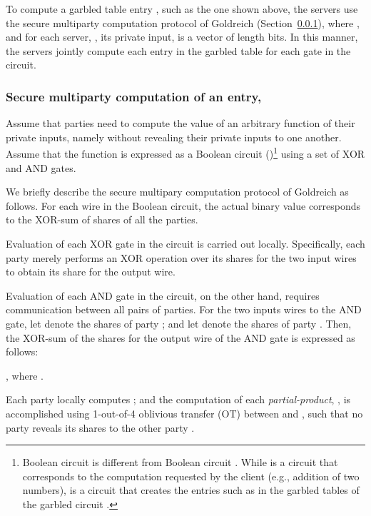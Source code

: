 \documentclass[10pt,journal,cspaper,compsoc]{IEEEtran}
\begin{document}
To compute a garbled table entry , such as the one shown above, the  servers use the secure multiparty computation protocol of Goldreich \cite{goldreich04,goldreich87} (Section~\ref{sec_secure_multiparty_construction_Goldreich}), where , and for each server, , its private input,  is a vector of length  bits. In this manner, the  servers jointly compute each entry in the garbled table for each gate in the circuit.



\subsubsection{Secure multiparty computation of an entry, }
\label{sec_secure_multiparty_construction_Goldreich}

Assume that  parties need to compute the value of an arbitrary function of their private inputs, namely  without revealing their private inputs to one another. Assume that the function  is expressed as a Boolean circuit ()\footnote{Boolean circuit  is different from Boolean circuit . While  is a circuit that corresponds to the computation requested by the client (e.g., addition of two numbers),  is a circuit that creates the entries such as  in the garbled tables of the garbled circuit .} using a set of XOR and AND gates.


We briefly describe the secure multipary computation protocol of Goldreich \cite{goldreich04,goldreich87} as follows. For each wire in the Boolean circuit, the actual binary value corresponds to the XOR-sum of shares of all the  parties.


Evaluation of each XOR gate in the circuit is carried out locally. Specifically, each party merely performs an XOR operation over its shares for the two input wires to obtain its share for the output wire.


Evaluation of each AND gate in the circuit, on the other hand, requires communication between all pairs of parties. For the two inputs wires to the AND gate, let  denote the shares of party ; and let  denote the shares of party . Then, the XOR-sum of the shares for the output wire of the AND gate is expressed as follows:

, where   .


Each party  locally computes ; and the computation of each {\em partial-product}, , is accomplished using 1-out-of-4 oblivious transfer (OT) between  and , such that no party reveals its shares to the other party \cite{goldreich04,goldreich87}.
\end{document}
